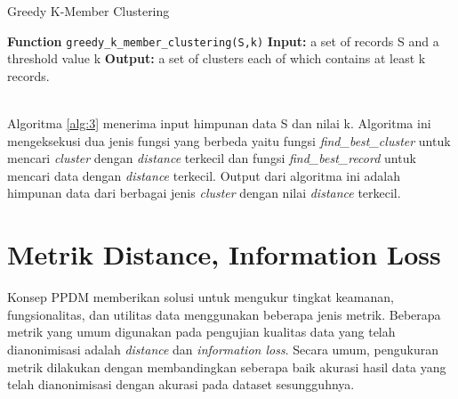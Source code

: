 \begin{algorithm}[H]
  \caption{Greedy K-Member Clustering}		 \label{alg:3}
  \begin{algorithmic}[1]
  \State \textbf{Function} \texttt{greedy\_k\_member\_clustering(S,k)}
  \State \textbf{Input:} a set of records S and a threshold value k
  \State \textbf{Output:} a set of clusters each of which contains at least k records.
  \\
  \EndIf
  \\
  	\EndWhile
  \EndWhile
  \EndWhile
  \end{algorithmic}
\end{algorithm}

Algoritma \ref{alg:3} menerima input himpunan data S dan nilai k. Algoritma ini mengeksekusi dua jenis fungsi yang berbeda yaitu fungsi \textit{find\_best\_cluster} untuk mencari \textit{cluster} dengan \textit{distance} terkecil dan fungsi \textit{find\_best\_record} untuk mencari data dengan \textit{distance} terkecil. Output dari algoritma ini adalah himpunan data dari berbagai jenis \textit{cluster} dengan nilai \textit{distance} terkecil.



\section{Metrik Distance, Information Loss} 
\label{theory:dist,il,cf}
Konsep PPDM memberikan solusi untuk mengukur tingkat keamanan, fungsionalitas, dan utilitas data menggunakan beberapa jenis metrik.  Beberapa metrik yang umum digunakan pada pengujian kualitas data yang telah dianonimisasi adalah \textit{distance} dan \textit{information loss}. Secara umum, pengukuran metrik dilakukan dengan membandingkan seberapa baik akurasi hasil data yang telah dianonimisasi dengan akurasi pada dataset sesungguhnya. 

